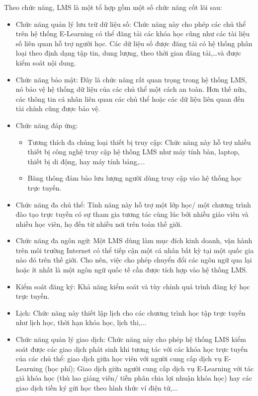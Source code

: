 {Theo chức năng, LMS là một tổ hợp gồm một số chức năng cốt lõi sau:}
\begin{itemize}
	\item Chức năng quản lý lưu trữ dữ liệu số: Chức năng này cho phép các chủ thể trên hệ thống E-Learning có thể đăng tải các khóa học cũng như các tài liệu số liên quan hỗ trợ người học. Các dữ liệu số được đăng tải có hệ thống phân loại theo định dạng tập tin, dung lượng, theo thời gian đăng tải,…và được kiểm soát nội dung.
	\item Chức năng bảo mật: Đây là chức năng rất quan trọng trong hệ thống LMS, nó bảo vệ hệ thống dữ liệu của các chủ thể một cách an toàn. Hơn thế nữa, các thông tin cá nhân liên quan các chủ thể hoặc các dữ liệu liên quan đến tài chính cũng được bảo vệ.
	\item Chức năng đáp ứng: 
	\begin{itemize}
		\item Tương thích đa chủng loại thiết bị truy cập: Chức năng này hỗ trợ nhiều thiết bị công nghệ truy cập hệ thống LMS như máy tính bàn, laptop, thiết bị di động, hay máy tính bảng,...
		\item Băng thông đảm bảo lưu lượng người dùng truy cập vào hệ thống học trực tuyến.
	\end{itemize}
	\item Chức năng đa chủ thể: Tính năng này hỗ trợ một lớp học/ một chương trình đào tạo trực tuyến có sự tham gia tương tác cùng lúc bởi nhiều giáo viên và nhiều học viên, họ đến từ nhiều nơi trên toàn thế giới.
	\item Chức năng đa ngôn ngữ: Một LMS dùng làm mục đích kinh doanh, vận hành trên môi trường Internet có thể tiếp cận một cá nhân bất kỳ tại một quốc gia nào đó trên thế giới. Cho nên, việc cho phép chuyển đổi các ngôn ngữ qua lại hoặc ít nhất là một ngôn ngữ quốc tế cần được tích hợp vào hệ thống LMS.
	\item Kiểm soát đăng ký: Khả năng kiểm soát và tùy chỉnh quá trình đăng ký học trực tuyến.
	\item Lịch: Chức năng này thiết lập lịch cho các chương trình học tập trực tuyến như lịch học, thời hạn khóa học, lịch thi,...
	\item Chức năng quản lý giao dịch: Chức năng này cho phép hệ thống LMS kiểm soát được các giao dịch phát sinh khi tương tác với các khóa học trực tuyến của các chủ thể: giao dịch giữa học viên với người cung cấp dịch vụ E-Learning (học phí); Giao dịch giữa người cung cấp dịch vụ E-Learning với tác giả khóa học (thù lao giảng viên/ tiền phân chia lợi nhuận khóa học) hay các giao dịch tiền ký gửi học theo hình thức ví điện tử,...

\end{itemize}
